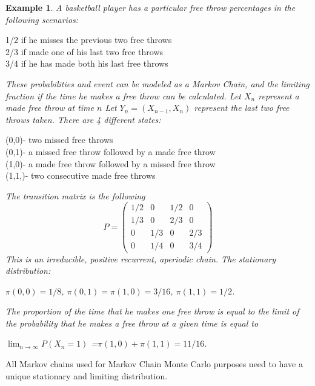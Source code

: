 \documentclass[11pt,a4paper]{article}
\theoremstyle{plain}
\newtheorem{exmp}[fact]{Example}
\begin{document}
\begin{exmp}
A basketball player has a particular free throw percentages in the following scenarios: 
\begin{description}
  \item[1/2 if he misses the previous two free throws]
  \item [2/3 if made one of his last two free throws]
  \item[ 3/4 if he has made both his last free throws]
\end{description}
These probabilities and event can be modeled as a Markov Chain, and the limiting fraction if the time he makes a free throw can be calculated.
\newline Let $X_n$ represent a made free throw at time $n$
\newline Let $Y_n=(X_{n-1},X_n)$ represent the last two free throws taken. 
\newline There are 4 different states:
\begin{description}
  \item[(0,0)- two missed free throws]
  \item [(0,1)- a missed free throw followed by a made free throw] 
  \item[(1,0)- a made free throw followed by a missed free throw] 
  \item[(1,1,)- two consecutive made free throws]
\end{description}

The transition matrix is the following 
$$
P=
\begin{pmatrix} 
1/2 & 0 & 1/2 & 0\\
1/3 & 0 & 2/3 & 0\\
0 & 1/3 & 0 & 2/3\\
0 & 1/4 & 0 & 3/4
\end{pmatrix}
$$
\newline This is an irreducible, positive recurrent, aperiodic chain. The stationary distribution: 
\begin{center}$\pi(0,0)=1/8$, $\pi(0,1)=\pi(1,0)=3/16$, $\pi(1,1)=1/2$.
\end{center}
The proportion of the time that he makes one free throw is equal to the limit of the probability that he makes a free throw at a given time is equal to 
\begin{center}
$\lim_{n\rightarrow \infty}P(X_n=1)$ =$\pi(1,0)+\pi(1,1)=11/16$.
\end{center}
\end{exmp}
All Markov chains used for Markov Chain Monte Carlo purposes need to have a unique stationary and limiting distribution.
\end{document}
